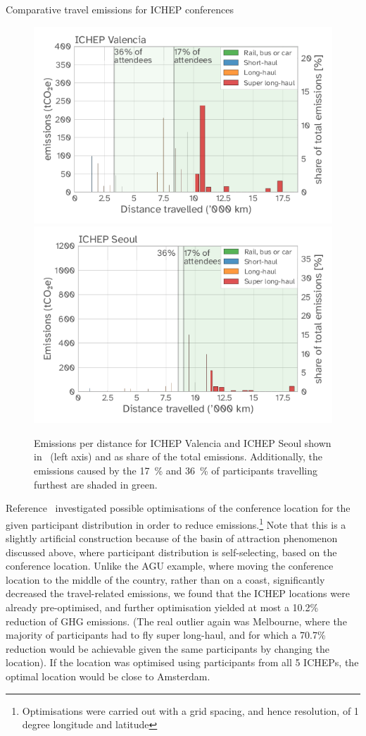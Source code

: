\documentclass[../SustainableHEP.tex]{subfiles}
\begin{document}
\begin{casestudy}{Comparative travel emissions for ICHEP conferences}
\begin{figure}
    \captionsetup{type=figure}
    {\includegraphics[width=.49\textwidth]{Sections/Figs/Travel/EmissionsDistanceVLC.png}}
    {\includegraphics[width=.49\textwidth]{Sections/Figs/Travel/EmissionsDistanceICN.png}}\\
    \caption[Emissions per distance for two different ICHEP editions]{Emissions per distance for ICHEP Valencia and ICHEP Seoul shown in \tCdOe\ (left axis) and as share of the total emissions. Additionally, the emissions caused by the 17~\% and 36~\% of participants travelling furthest are shaded in green.}\label{fig:EmmPerDistance}
\end{figure}

Reference~\cite{RefAGU} investigated possible optimisations of the conference location for the given participant distribution in order to reduce emissions.\footnote{Optimisations were carried out with a grid spacing, and hence resolution, of 1 degree longitude and latitude}  Note that this is a slightly artificial construction because of the basin of attraction phenomenon discussed above, where participant distribution is self-selecting, based on the conference location. Unlike the AGU example, where moving the conference location to the middle of the country, rather than on a coast, significantly decreased the travel-related emissions, we found that the ICHEP locations were already pre-optimised, and further optimisation yielded at most a 10.2\% reduction of GHG emissions.  (The real outlier again was Melbourne, where the majority of participants had to fly super long-haul, and for which a 70.7\% reduction would be achievable given the same participants by changing the location).  If the location was optimised using participants from all 5 ICHEPs, the optimal location would be close to Amsterdam.


\end{casestudy}
\end{document}
